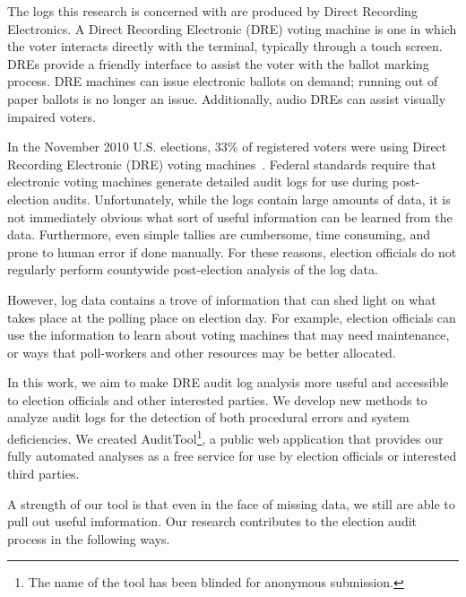 \documentclass[letterpaper,twocolumn,10pt]{article}
\begin{document}
The logs this research is concerned with are produced by Direct Recording 
Electronics. A Direct Recording Electronic (DRE) voting machine is one in which
 the voter interacts directly with the terminal, typically through a touch 
screen. DREs provide a friendly interface to assist the voter with the ballot 
marking process. DRE machines can issue electronic ballots on demand; running 
out of paper ballots is no longer an issue. Additionally, audio DREs can assist
visually impaired voters.

In the November 2010 U.S. elections, 33\% of registered voters were using Direct
Recording Electronic (DRE) voting machines~\cite{verifiedvoting-votingsystems}.
Federal standards require that electronic voting machines generate detailed
audit logs for use during post-election audits. Unfortunately, while the logs
contain large amounts of data, it is not immediately obvious what sort of useful
information can be learned from the data. Furthermore, even simple
tallies are cumbersome, time consuming, and prone to human error if done
manually. For these reasons, election officials do not regularly perform
countywide post-election analysis of the log data.

However, log data contains a trove of information that can shed light
on what takes place at the polling place on election day. For example,
election officials can use the information to learn about voting machines that
may need maintenance, or ways that poll-workers and other resources may be
better allocated.

In this work, we aim to make DRE audit log analysis more useful and accessible
to election officials and other interested parties. We develop new methods to
analyze audit logs for the detection of both procedural errors and system
deficiencies. We created AuditTool\footnote{The name of the tool has been
  blinded for anonymous submission.}, a public web application that provides our 
fully automated analyses as a free service for use by election officials or
interested third parties.  

A strength of our tool is that even in the face of missing data, we still are 
able to pull out useful imformation. Our research contributes to the election 
audit process in the following ways.
\end{document}
